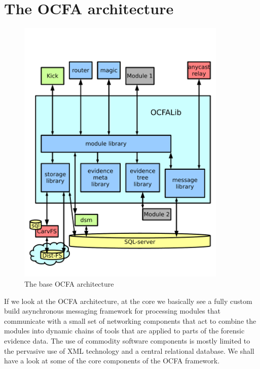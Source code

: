 \section{The OCFA architecture}
\begin{figure}
\centering
\includegraphics[width=100mm]{mattock/libraryview.pdf}
\caption{The base OCFA architecture}
\label{fig:FlowInOut}
\end{figure}
If we look at the OCFA architecture, at the core we basically see a fully custom build asynchronous messaging framework for processing modules that communicate with a small set of networking components that act to combine the modules into dynamic chains of tools that are applied to parts of the forensic evidence data. The use of commodity software components is mostly limited to the pervasive use of XML technology and a central relational database. We shall have a look at some of the core components of the OCFA framework.
